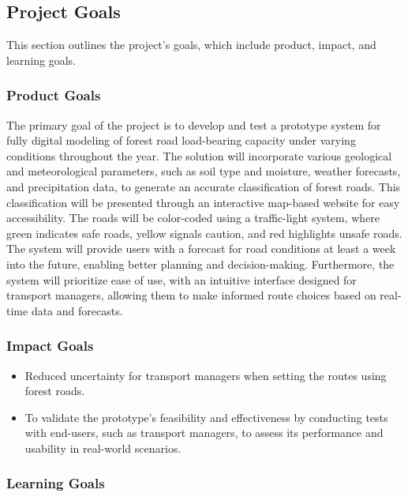 \subsection{Project Goals}
This section outlines the project's goals, which include product, impact, and learning goals.
\subsubsection{Product Goals}
The primary goal of the project is to develop and test a prototype system for fully digital modeling of forest road load-bearing capacity under varying conditions throughout the year. The solution will incorporate various geological and meteorological parameters, such as soil type and moisture, weather forecasts, and precipitation data, to generate an accurate classification of forest roads. This classification will be presented through an interactive map-based website for easy accessibility. The roads will be color-coded using a traffic-light system, where green indicates safe roads, yellow signals caution, and red highlights unsafe roads. The system will provide users with a forecast for road conditions at least a week into the future, enabling better planning and decision-making. Furthermore, the system will prioritize ease of use, with an intuitive interface designed for transport managers, allowing them to make informed route choices based on real-time data and forecasts. 

\subsubsection{Impact Goals}
\begin{itemize}
    \item Reduced uncertainty for transport managers when setting the routes using forest roads.
    \item To validate the prototype's feasibility and effectiveness by conducting tests with end-users, such as transport managers, to assess its performance and usability in real-world scenarios.
\end{itemize}

\subsubsection{Learning Goals}

